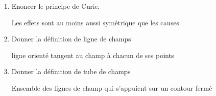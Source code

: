 \documentclass{article}
\begin{document}
\begin{enumerate}[label=\arabic{enumi} - , left=0pt, itemsep=1em]
\begin{solution}
    \end{solution}
        \item Enoncer le principe de Curie. \par
    \begin{solution}
     Les effets sont au moins aussi symétrique que les causes
     \end{solution}
     \item Donner la définition de ligne de champs \par
     \begin{solution}
      ligne orienté tangent au champ à chacun de ses points
     \end{solution}
     \item Donner la définition de tube de champs \par
     \begin{solution}
      Ensemble des lignes de champ qui s'appuient sur un contour fermé 
     \end{solution}
\end{enumerate}
\end{document}
